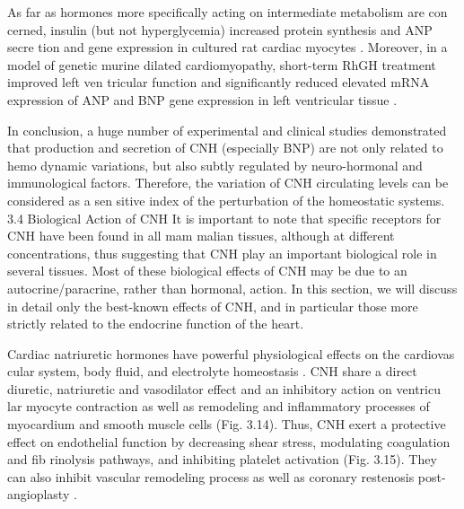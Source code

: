 \documentclass[14pt,a4paper,onecolumn]{extarticle}
\begin{document}
As far as hormones more specifically acting on intermediate metabolism are con cerned, insulin (but not hyperglycemia) increased protein synthesis and ANP secre tion and gene expression in cultured rat cardiac myocytes \citep{75}. Moreover, in a model of genetic murine dilated cardiomyopathy, short-term RhGH treatment improved left ven tricular function and significantly reduced elevated mRNA expression of ANP and BNP gene expression in left ventricular tissue \citep{76}.

In conclusion, a huge number of experimental and clinical studies demonstrated that production and secretion of CNH (especially BNP) are not only related to hemo dynamic variations, but also subtly regulated by neuro-hormonal and immunological factors. Therefore, the variation of CNH circulating levels can be considered as a sen sitive index of the perturbation of the homeostatic systems.  3.4 Biological Action of CNH It is important to note that specific receptors for CNH have been found in all mam malian tissues, although at different concentrations, thus suggesting that CNH play an important biological role in several tissues. Most of these biological effects of CNH may be due to an autocrine/paracrine, rather than hormonal, action. In this section, we will discuss in detail only the best-known effects of CNH, and in particular those more strictly related to the endocrine function of the heart.

Cardiac natriuretic hormones have powerful physiological effects on the cardiovas cular system, body fluid, and electrolyte homeostasis \citep{13} \citep{28} \citep{30} \citep{77} \citep{78}. CNH share a direct diuretic, natriuretic and vasodilator effect and an inhibitory action on ventricu lar myocyte contraction \citep{79} as well as remodeling and inflammatory processes of myocardium and smooth muscle cells \citep{80} \citep{81} \citep{82} \citep{83} (Fig. 3.14). Thus, CNH exert a protective effect on endothelial function by decreasing shear stress, modulating coagulation and fib rinolysis pathways, and inhibiting platelet activation (Fig. 3.15). They can also inhibit vascular remodeling process as well as coronary restenosis post-angioplasty \citep{56} \citep{84} \citep{85} \citep{86} \citep{87} \citep{88} \citep{89}.
\end{document}
